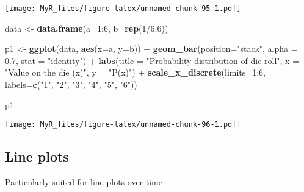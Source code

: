\documentclass[]{book}
\newenvironment{Shaded}{}{}
\newcommand{\DataTypeTok}[1]{\textcolor[rgb]{0.56,0.13,0.00}{#1}}
\newcommand{\DecValTok}[1]{\textcolor[rgb]{0.25,0.63,0.44}{#1}}
\newcommand{\FloatTok}[1]{\textcolor[rgb]{0.25,0.63,0.44}{#1}}
\newcommand{\KeywordTok}[1]{\textcolor[rgb]{0.00,0.44,0.13}{\textbf{#1}}}
\newcommand{\NormalTok}[1]{#1}
\newcommand{\OperatorTok}[1]{\textcolor[rgb]{0.40,0.40,0.40}{#1}}
\newcommand{\StringTok}[1]{\textcolor[rgb]{0.25,0.44,0.63}{#1}}
\theoremstyle{definition}
\theoremstyle{definition}
\theoremstyle{definition}
\theoremstyle{remark}
\begin{document}
\texttt{[image: MyR\_files/figure-latex/unnamed-chunk-95-1.pdf]}

\begin{Shaded}
\begin{Highlighting}[]
\NormalTok{data <-}\StringTok{ }\KeywordTok{data.frame}\NormalTok{(}\DataTypeTok{a=}\DecValTok{1}\OperatorTok{:}\DecValTok{6}\NormalTok{, }\DataTypeTok{b=}\KeywordTok{rep}\NormalTok{(}\DecValTok{1}\OperatorTok{/}\DecValTok{6}\NormalTok{,}\DecValTok{6}\NormalTok{))}

\NormalTok{p1 <-}\StringTok{ }\KeywordTok{ggplot}\NormalTok{(data, }\KeywordTok{aes}\NormalTok{(}\DataTypeTok{x=}\NormalTok{a, }\DataTypeTok{y=}\NormalTok{b)) }\OperatorTok{+}
\StringTok{      }\KeywordTok{geom_bar}\NormalTok{(}\DataTypeTok{position=}\StringTok{"stack"}\NormalTok{, }\DataTypeTok{alpha =} \FloatTok{0.7}\NormalTok{, }\DataTypeTok{stat =} \StringTok{"identity"}\NormalTok{) }\OperatorTok{+}
\StringTok{      }\KeywordTok{labs}\NormalTok{(}\DataTypeTok{title =} \StringTok{"Probability distribution of die roll"}\NormalTok{, }\DataTypeTok{x =} \StringTok{"Value on the die (x)"}\NormalTok{, }\DataTypeTok{y =} \StringTok{"P(x)"}\NormalTok{) }\OperatorTok{+}
\StringTok{  }\KeywordTok{scale_x_discrete}\NormalTok{(}\DataTypeTok{limits=}\DecValTok{1}\OperatorTok{:}\DecValTok{6}\NormalTok{, }\DataTypeTok{labels=}\KeywordTok{c}\NormalTok{(}\StringTok{"1"}\NormalTok{, }\StringTok{"2"}\NormalTok{, }\StringTok{"3"}\NormalTok{, }\StringTok{"4"}\NormalTok{, }\StringTok{"5"}\NormalTok{, }\StringTok{"6"}\NormalTok{))}
      
\NormalTok{p1}
\end{Highlighting}
\end{Shaded}

\texttt{[image: MyR\_files/figure-latex/unnamed-chunk-96-1.pdf]}

\hypertarget{line-plots-1}{%
\subsection{Line plots}\label{line-plots-1}}

Particularly suited for line plots over time
\end{document}
